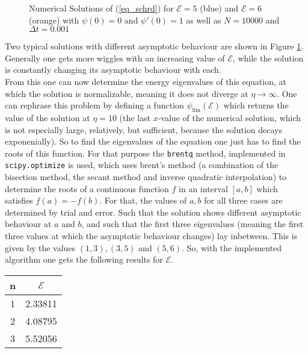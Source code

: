 \documentclass[12pt, a4paper]{article}
\begin{document}
  \begin{figure}[ht]
    
    \caption{Numerical Solutions of (\ref{eq_schrd}) for $\mathcal{E} = 5$ (blue) and $\mathcal{E} = 6$ (orange) with $\psi(0) = 0$ and $\psi'(0) = 1$ as well as $N = 10000$ and $\Delta t = 0.001$}
    \label{fig_ex_sols}
  \end{figure}

  \noindent
  Two typical solutions with different asymptotic behaviour are shown in Figure \ref{fig_ex_sols}. Generally one gets more \glqq wiggles\grqq{} with an increasing value of $\mathcal{E}$, while the solution is constantly changing its asymptotic behaviour with each.\\
  From this one can now determine the energy eigenvalues of this equation, at which the solution is normalizable, meaning it does not diverge at $\eta \rightarrow \infty$. One can rephrase this problem by defining a function $\psi_{\lim}(\mathcal{E})$ which returns the value of the solution at $\eta = 10$ (the last $x$-value of the numerical solution, which is not especially large, relatively, but sufficient, because the solution decays exponenially). So to find the eigenvalues of the equation one just has to find the roots of this function. For that purpose the {\tt brentq} method, implemented in {\tt scipy.optimize} is used, which uses brent's method (a combination of the bisection method, the secant method and inverse quadratic interpolation) to determine the roots of a continuous function $f$ in an interval $[a, b]$ which satisfies $f(a) = -f(b)$. For that, the values of $a, b$ for all three cases are determined by trial and error. Such that the solution shows different asymptotic behaviour at $a$ and $b$, and such that the first three eigenvalues (meaning the first three values at which the asymptotic behaviour changes) lay inbetween. This is given by the values $(1, 3), (3, 5)$ and $(5, 6)$. So, with the implemented algorithm one gets the following results for $\mathcal{E}$.

  \begin{center}
    \begin{tabular}{c | c}
      n & $\mathcal{E}$ \\
      \hline
      1 & 2.33811 \\
      2 & 4.08795 \\
      3 & 5.52056 \\
    \end{tabular}
    \label{table_ev}
  \end{center}
\end{document}
